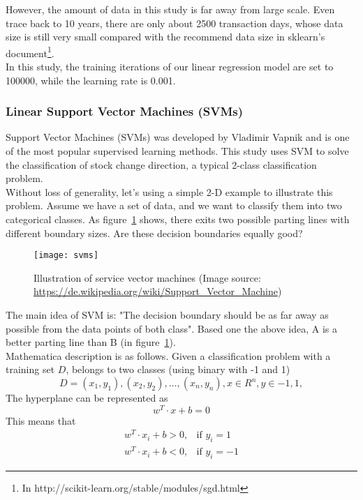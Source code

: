 However, the amount of data in this study is far away from large scale. Even trace back to 10 years, there are only about 2500 transaction days, whose data size is still very small compared with the recommend data size in sklearn's document\footnote{In http://scikit-learn.org/stable/modules/sgd.html}.\\

In this study, the training iterations of our linear regression model are set to 100000, while the learning rate is 0.001.

\subsubsection{Linear Support Vector Machines (SVMs)}
Support Vector Machines (SVMs) was developed by Vladimir Vapnik\cite[p.~105]{4_kantardzic} and is one of the most popular supervised learning methods. This study uses SVM to solve the classification of stock change direction, a typical 2-class classification problem.\\


Without loss of generality, let's using a simple 2-D example to illustrate this problem. Assume we have a set of data, and we want to classify them into two categorical classes. As figure~\ref{fg:SVM} shows, there exits two possible parting lines with different boundary sizes. Are these decision boundaries equally good?
\begin{figure}[h]
	\centering
	\texttt{[image: svms]}
	\caption{Illustration of service vector machines (Image source: \url{https://de.wikipedia.org/wiki/Support_Vector_Machine})}
	\label{fg:SVM}
\end{figure}
The main idea of SVM is: "The decision boundary should be as far away as possible from the data points of both class"\cite[p.~107]{4_kantardzic}. Based one the above idea, A is a better parting line than B (in figure~\ref{fg:SVM}).\\


Mathematica description is as follows\cite[Section~4.5]{4_kantardzic}. Given a classification problem with a training set $ D $, belongs to two classes (using binary with -1 and 1)
\begin{equation}
D={(x_1,y_1),(x_2,y_2),\dots,(x_n,y_n)},x\in R^n, y\in{-1, 1},
\end{equation}
The hyperplane can be represented as
\begin{equation}
w^T \cdot x+b=0
\end{equation}
This means that
\begin{align*}
w^T\cdot x_i+b>0,& \text{if $y_i = 1$}\\
w^T\cdot x_i+b<0,& \text{if $y_i = -1$}
\end{align*}


